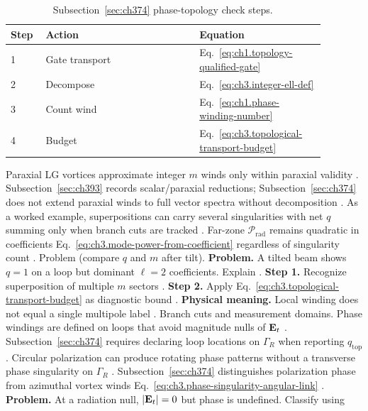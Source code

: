 \begin{table}[t]
\centering
\caption{Subsection~\ref{sec:ch374} phase-topology check steps.}
\label{tab:ch3.374-audit-steps}
\small
\begin{tabular}{@{}p{0.08\linewidth}p{0.44\linewidth}p{0.36\linewidth}@{}}
\toprule
Step & Action & Equation \\
\midrule
1 & Gate transport & Eq.~\eqref{eq:ch1.topology-qualified-gate} \\
2 & Decompose & Eq.~\eqref{eq:ch3.integer-ell-def} \\
3 & Count wind & Eq.~\eqref{eq:ch1.phase-winding-number} \\
4 & Budget & Eq.~\eqref{eq:ch3.topological-transport-budget} \\
\bottomrule
\end{tabular}
\end{table}
Paraxial LG vortices approximate integer \(m\) winds only within paraxial validity \cite{allen1992}. Subsection~\ref{sec:ch393}
records scalar/paraxial reductions; Subsection~\ref{sec:ch374} does not extend paraxial winds to full vector spectra without
decomposition \cite{harrington2001}.
As a worked example, superpositions can carry several singularities with net \(q\) summing only when branch cuts are tracked \cite{allen1992}.
Far-zone \(\mathcal{P}_{\mathrm{rad}}\) remains quadratic in coefficients Eq.~\eqref{eq:ch3.mode-power-from-coefficient}
regardless of singularity count \cite{poynting1884}.
Problem (compare \(q\) and \(m\) after tilt). \textbf{Problem.} A tilted beam shows \(q=1\) on a loop but dominant \(\ell=2\) coefficients. Explain
\cite{allen1992}.
\textbf{Step 1.} Recognize superposition of multiple \(m\) sectors \cite{hansen1988}.
\textbf{Step 2.} Apply Eq.~\eqref{eq:ch3.topological-transport-budget} as diagnostic bound \cite{harrington2001}.
\textbf{Physical meaning.} Local winding does not equal a single multipole label \cite{stratton1941}.
Branch cuts and measurement domains. Phase windings are defined on loops that avoid magnitude nulls of \(\mathbf{E}_{t}\) \cite{allen1992}. Subsection~\ref{sec:ch374}
requires declaring loop locations on \(\Gamma_R\) when reporting \(q_{\mathrm{top}}\) \cite{harrington2001}.
Circular polarization can produce rotating phase patterns without a transverse phase singularity on \(\Gamma_R\)
\cite{jackson1999}. Subsection~\ref{sec:ch374} distinguishes polarization phase from azimuthal
vortex winds Eq.~\eqref{eq:ch3.phase-singularity-angular-link} \cite{stratton1941}.
\textbf{Problem.} At a radiation null, \(|\mathbf{E}_{t}|=0\) but phase is undefined. Classify using
